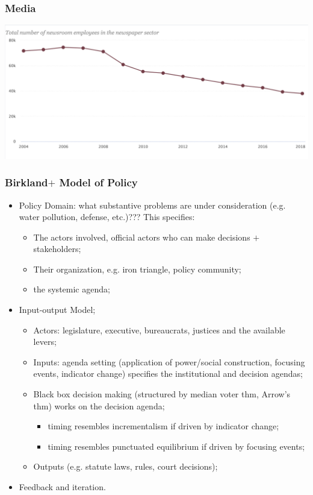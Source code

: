\documentclass[aspectratio=169]{beamer}
\theoremstyle{principle}
\begin{document}
\begin{frame}
\frametitle{Media}
    \begin{center}
     \includegraphics[scale=0.45]{newsrooms.png}
     \end{center}
\end{frame}

\begin{frame}
\frametitle{Birkland$+$ Model of Policy}
\begin{itemize}
\item Policy Domain: what substantive problems are under consideration (e.g. water pollution, defense, etc.)???  This specifies:
\begin{itemize}
\item The actors involved, official actors who can make decisions $+$ stakeholders; 
\item Their organization, e.g. iron triangle, policy community;
\item the systemic agenda; 
\end{itemize}
\bigskip
\item \color{black}Input-output Model;
\begin{itemize}
\item Actors: legislature, executive, bureaucrats, justices and the available levers;
\item Inputs: agenda setting (application of power/social construction, focusing events, indicator change) specifies the institutional and decision agendas;
\item Black box decision making (structured by median voter thm, Arrow's thm) works on the decision agenda;
\begin{itemize}
\item timing resembles incrementalism if driven by indicator change;
\item timing resembles punctuated equilibrium if driven by focusing events;
 \end{itemize}
\item Outputs (e.g. statute laws, rules, court decisions);
\end{itemize}
\bigskip
\item Feedback and iteration.
\end{itemize}
\end{frame}
\end{document}
